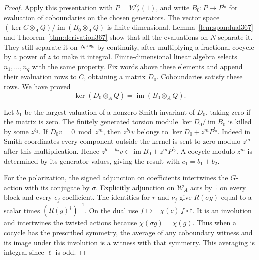 \documentclass[a4paper,11pt]{article}
\theoremstyle{definition}
\theoremstyle{remark}
\numberwithin{equation}{section}
\begin{document}
\begin{proof}
Apply this presentation with \(P=\mathcal W_A^\vee(1)\),
and write \(B_0:P\to P^{l_0}\) for evaluation of coboundaries
on the chosen generators. The vector space
\((\ker C\otimes_A Q)/\operatorname{im}(B_0\otimes_A Q)\)
is finite-dimensional. Lemma~\ref{lem:spandual367} and
Theorem~\ref{thm:derivation367} show that all the evaluations
on \(N\) separate it. They still separate it on \(N^{\rm reg}\)
by continuity, after multiplying a fractional cocycle by a
power of \(z\) to make it integral. Finite-dimensional
linear algebra selects \(n_1,\ldots,n_q\) with the same
property. Fix words above these elements and append their
evaluation rows to \(C\), obtaining a matrix \(D_0\).
Coboundaries satisfy these rows. We have proved
\[
          \ker(D_0\otimes_A Q)=\operatorname{im}(B_0\otimes_A Q).
\]

Let \(b_1\) be the largest valuation of a nonzero Smith
invariant of \(D_0\), taking zero if the matrix is zero.
The finitely generated torsion module
\(\ker D_0/\operatorname{im} B_0\) is killed by some
\(z^{b_2}\). If \(D_0v=0\bmod z^m\), then
\(z^{b_1}v\) belongs to \(\ker D_0+z^m P^{l_0}\).
Indeed in Smith coordinates every component outside the
kernel is sent to zero modulo \(z^m\) after this
multiplication. Hence
\(z^{b_1+b_2}v\in\operatorname{im}B_0+z^m P^{l_0}\).
A cocycle modulo \(z^m\) is determined by its generator
values, giving the result with \(c_1=b_1+b_2\).

For the polarization, the signed adjunction on coefficients
intertwines the \(G\)-action with its conjugate by \(\sigma\).
Explicitly adjunction on \(\mathcal W_A\) acts by \(\dagger\)
on every block and every \(e_j\)-coefficient. The identities
for \(r\) and \(\nu_j\) give
\(R(\sigma g)\) equal to a scalar times \((R(g)^\dagger)^{-1}\).
On the dual use \(f\mapsto-\chi(c)\,f\circ\dagger\).
It is an involution and intertwines the twisted actions
because \(\chi(\sigma g)=\chi(g)\). Thus when a cocycle
has the prescribed symmetry, the average of any coboundary
witness and its image under this involution is a witness
with that symmetry. This averaging is integral since
\(\ell\) is odd.
\end{proof}
\end{document}
